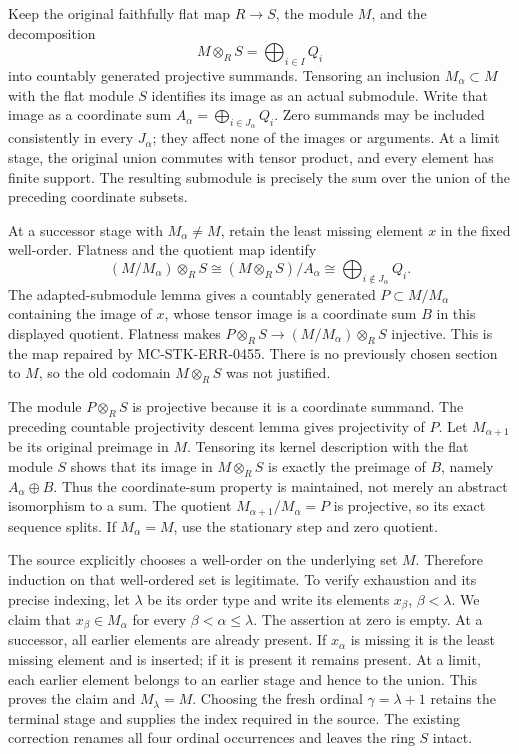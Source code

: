 Keep the original faithfully flat map \(R\to S\), the module \(M\), and the decomposition \[
M\otimes_R S=\bigoplus_{i\in I}Q_i
\] into countably generated projective summands. Tensoring an inclusion \(M_\alpha\subset M\) with the flat module \(S\) identifies its image as an actual submodule. Write that image as a coordinate sum \(A_\alpha=\bigoplus_{i\in J_\alpha}Q_i\). Zero summands may be included consistently in every \(J_\alpha\); they affect none of the images or arguments. At a limit stage, the original union commutes with tensor product, and every element has finite support. The resulting submodule is precisely the sum over the union of the preceding coordinate subsets.

At a successor stage with \(M_\alpha\ne M\), retain the least missing element \(x\) in the fixed well-order. Flatness and the quotient map identify \[
(M/M_\alpha)\otimes_R S
 \cong (M\otimes_R S)/A_\alpha
 \cong\bigoplus_{i\notin J_\alpha}Q_i .
\] The adapted-submodule lemma gives a countably generated \(P\subset M/M_\alpha\) containing the image of \(x\), whose tensor image is a coordinate sum \(B\) in this displayed quotient. Flatness makes \(P\otimes_R S\to(M/M_\alpha)\otimes_R S\) injective. This is the map repaired by MC-\AlgebraIdentifierBreak{}STK-\AlgebraIdentifierBreak{}ERR-\AlgebraIdentifierBreak{}0455. There is no previously chosen section to \(M\), so the old codomain \(M\otimes_R S\) was not justified.

The module \(P\otimes_R S\) is projective because it is a coordinate summand. The preceding countable projectivity descent lemma gives projectivity of \(P\). Let \(M_{\alpha+1}\) be its original preimage in \(M\). Tensoring its kernel description with the flat module \(S\) shows that its image in \(M\otimes_R S\) is exactly the preimage of \(B\), namely \(A_\alpha\oplus B\). Thus the coordinate-sum property is maintained, not merely an abstract isomorphism to a sum. The quotient \(M_{\alpha+1}/M_\alpha=P\) is projective, so its exact sequence splits. If \(M_\alpha=M\), use the stationary step and zero quotient.

The source explicitly chooses a well-order on the underlying set \(M\). Therefore induction on that well-ordered set is legitimate. To verify exhaustion and its precise indexing, let \(\lambda\) be its order type and write its elements \(x_\beta\), \(\beta<\lambda\). We claim that \(x_\beta\in M_\alpha\) for every \(\beta<\alpha\leq\lambda\). The assertion at zero is empty. At a successor, all earlier elements are already present. If \(x_\alpha\) is missing it is the least missing element and is inserted; if it is present it remains present. At a limit, each earlier element belongs to an earlier stage and hence to the union. This proves the claim and \(M_\lambda=M\). Choosing the fresh ordinal \(\gamma=\lambda+1\) retains the terminal stage and supplies the index required in the source. The existing correction renames all four ordinal occurrences and leaves the ring \(S\) intact.

